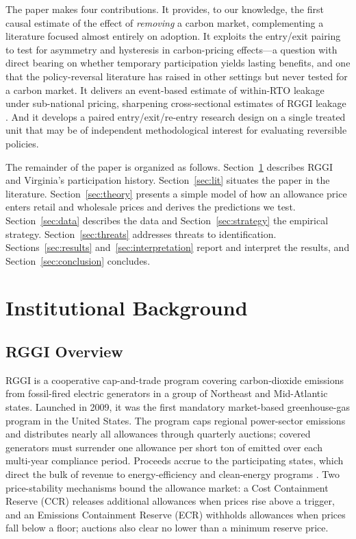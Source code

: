 \documentclass[12pt]{article}
\begin{document}
The paper makes four contributions. It provides, to our knowledge, the first causal estimate
of the effect of \emph{removing} a carbon market, complementing a literature focused almost
entirely on adoption. It exploits the entry/exit pairing to test for asymmetry and hysteresis
in carbon-pricing effects---a question with direct bearing on whether temporary participation
yields lasting benefits, and one that the policy-reversal literature has raised in other
settings \citep{Greenstone2002_caa,Walker2013_reallocation} but never tested for a carbon
market. It delivers an event-based estimate of within-RTO leakage under sub-national pricing,
sharpening cross-sectional estimates of RGGI leakage \citep{Fell2018_leakage}. And it develops
a paired entry/exit/re-entry research design on a single treated unit that may be of
independent methodological interest for evaluating reversible policies.

The remainder of the paper is organized as follows. Section~\ref{sec:background} describes
RGGI and Virginia's participation history. Section~\ref{sec:lit} situates the paper in the
literature. Section~\ref{sec:theory} presents a simple model of how an allowance price enters
retail and wholesale prices and derives the predictions we test.
Section~\ref{sec:data} describes the data and Section~\ref{sec:strategy} the empirical
strategy. Section~\ref{sec:threats} addresses threats to identification.
Sections~\ref{sec:results} and~\ref{sec:interpretation} report and interpret the results, and
Section~\ref{sec:conclusion} concludes.

\section{Institutional Background}\label{sec:background}

\subsection{RGGI Overview}\label{sec:rggi-overview}
RGGI is a cooperative cap-and-trade program covering carbon-dioxide emissions from
fossil-fired electric generators in a group of Northeast and Mid-Atlantic states. Launched in
2009, it was the first mandatory market-based greenhouse-gas program in the United States. The
program caps regional power-sector emissions and distributes nearly all allowances through
quarterly auctions; covered generators must surrender one allowance per short ton of \co{}
emitted over each multi-year compliance period. Proceeds accrue to the participating states,
which direct the bulk of revenue to energy-efficiency and clean-energy programs
\citep{AnalysisGroup2023_impacts}. Two price-stability mechanisms bound the allowance market:
a Cost Containment Reserve (CCR) releases additional allowances when prices rise above a
trigger, and an Emissions Containment Reserve (ECR) withholds allowances when prices fall
below a floor; auctions also clear no lower than a minimum reserve price.
\end{document}
